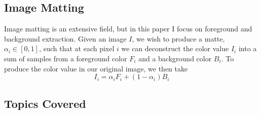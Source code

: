 \subsection{Image Matting}
Image matting is an extensive field, but in this paper I focus on foreground and background extraction. Given an image $I$, we wish to produce a matte, $\alpha_{i}\in[0,1]$, such that at each pixel $i$ we can deconstruct the color value $I_{i}$ into a sum of samples from a foreground color $F_{i}$ and a background color $B_{i}$. To produce the color value in our original image, we then take
\[I_{i}=\alpha_{i}F_{i}+(1-\alpha_{i})B_{i}\]
\subsection{Topics Covered}